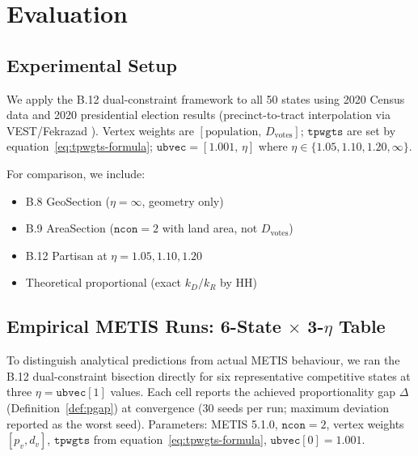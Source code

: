 \section{Evaluation}
\label{sec:eval}

\subsection{Experimental Setup}

We apply the B.12 dual-constraint framework to all 50 states using 2020 Census
data and 2020 presidential election results (precinct-to-tract interpolation
via VEST/Fekrazad \citep{fekrazad2021}).
Vertex weights are $[\text{population},\, D_{\text{votes}}]$;
$\mathtt{tpwgts}$ are set by equation~\eqref{eq:tpwgts-formula};
$\mathtt{ubvec} = [1.001,\, \eta]$ where $\eta \in \{1.05, 1.10, 1.20, \infty\}$.

For comparison, we include:
\begin{itemize}
  \item B.8 GeoSection ($\eta = \infty$, geometry only)
  \item B.9 AreaSection ($\mathtt{ncon}=2$ with land area, not $D_{\text{votes}}$)
  \item B.12 Partisan at $\eta = 1.05, 1.10, 1.20$
  \item Theoretical proportional (exact $k_D/k_R$ by HH)
\end{itemize}

\subsection{Empirical METIS Runs: 6-State $\times$ 3-$\eta$ Table}
\label{sec:eval:empirical6}

To distinguish analytical predictions from actual METIS behaviour, we ran the
B.12 dual-constraint bisection directly for six representative competitive states
at three $\eta = \mathtt{ubvec}[1]$ values.
Each cell reports the achieved proportionality gap $\Delta$ (Definition~\ref{def:pgap})
at convergence (30 seeds per run; maximum deviation reported as the worst seed).
Parameters: METIS 5.1.0, $\mathtt{ncon}=2$, vertex weights $[p_v, d_v]$,
$\mathtt{tpwgts}$ from equation~\eqref{eq:tpwgts-formula}, $\mathtt{ubvec}[0] = 1.001$.

